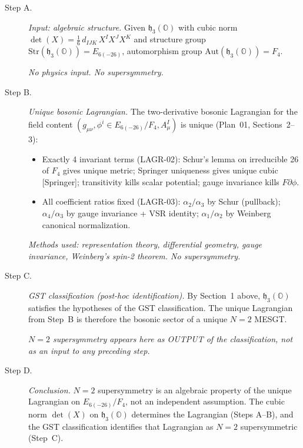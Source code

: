 \begin{description}
  \item[Step A.] \textit{Input: algebraic structure.}
    Given $\mathfrak{h}_3(\mathbb{O})$ with cubic norm
    $\det(X) = \frac{1}{6}\,d_{IJK}\,X^I X^J X^K$ and structure group
    $\mathrm{Str}(\mathfrak{h}_3(\mathbb{O})) = E_{6(-26)}$,
    automorphism group $\mathrm{Aut}(\mathfrak{h}_3(\mathbb{O})) = F_4$.

    \textit{No physics input. No supersymmetry.}

  \item[Step B.] \textit{Unique bosonic Lagrangian.}
    The two-derivative bosonic Lagrangian for the field content
    $(g_{\mu\nu}, \phi^i \in E_{6(-26)}/F_4, A^I_\mu)$ is unique
    (Plan~01, Sections~2--3):
    \begin{itemize}
      \item Exactly 4 invariant terms (LAGR-02):
            Schur's lemma on irreducible 26 of $F_4$ gives unique
            metric; Springer uniqueness gives unique cubic [Springer];
            transitivity kills scalar potential; gauge invariance
            kills $F\partial\phi$.
      \item All coefficient ratios fixed (LAGR-03):
            $\alpha_2/\alpha_3$ by Schur (pullback);
            $\alpha_4/\alpha_3$ by gauge invariance + VSR identity;
            $\alpha_1/\alpha_2$ by Weinberg canonical normalization.
    \end{itemize}

    \textit{Methods used: representation theory, differential geometry,
    gauge invariance, Weinberg's spin-2 theorem. No supersymmetry.}

  \item[Step C.] \textit{GST classification (post-hoc identification).}
    By Section~1 above, $\mathfrak{h}_3(\mathbb{O})$ satisfies the
    hypotheses of the GST classification. The unique Lagrangian from
    Step~B is therefore the bosonic sector of a unique $N=2$ MESGT.

    \textit{$N=2$ supersymmetry appears here as OUTPUT of the
    classification, not as an input to any preceding step.}

  \item[Step D.] \textit{Conclusion.}
    $N=2$ supersymmetry is an algebraic property of the unique
    Lagrangian on $E_{6(-26)}/F_4$, not an independent assumption.
    The cubic norm $\det(X)$ on $\mathfrak{h}_3(\mathbb{O})$ determines
    the Lagrangian (Steps A--B), and the GST classification identifies
    that Lagrangian as $N=2$ supersymmetric (Step~C).
\end{description}

